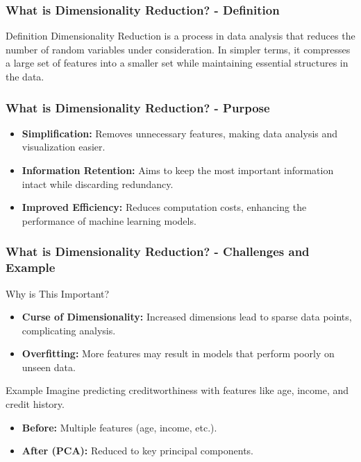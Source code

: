 \documentclass[aspectratio=169]{beamer}
\begin{document}
\begin{frame}[fragile]
    \frametitle{What is Dimensionality Reduction? - Definition}
    \begin{block}{Definition}
        Dimensionality Reduction is a process in data analysis that reduces the number of random variables under consideration. In simpler terms, it compresses a large set of features into a smaller set while maintaining essential structures in the data.
    \end{block}
\end{frame}

\begin{frame}[fragile]
    \frametitle{What is Dimensionality Reduction? - Purpose}
    \begin{itemize}
        \item \textbf{Simplification:} Removes unnecessary features, making data analysis and visualization easier.
        \item \textbf{Information Retention:} Aims to keep the most important information intact while discarding redundancy.
        \item \textbf{Improved Efficiency:} Reduces computation costs, enhancing the performance of machine learning models.
    \end{itemize}
\end{frame}

\begin{frame}[fragile]
    \frametitle{What is Dimensionality Reduction? - Challenges and Example}
    \begin{block}{Why is This Important?}
        \begin{itemize}
            \item \textbf{Curse of Dimensionality:} Increased dimensions lead to sparse data points, complicating analysis.
            \item \textbf{Overfitting:} More features may result in models that perform poorly on unseen data.
        \end{itemize}
    \end{block}

    \begin{block}{Example}
        Imagine predicting creditworthiness with features like age, income, and credit history.
        \begin{itemize}
            \item \textbf{Before:} Multiple features (age, income, etc.).
            \item \textbf{After (PCA):} Reduced to key principal components.
        \end{itemize}
    \end{block}
\end{frame}
\end{document}
